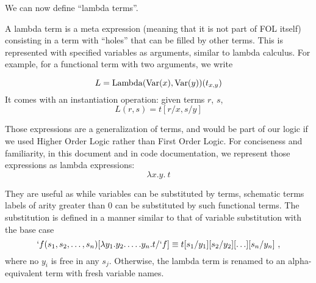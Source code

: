 We can now define \enquote{lambda terms}.
\begin{defin}
  A lambda term is a  meta expression (meaning that it is not part of FOL itself) consisting in a term with ``holes'' that can be filled by other terms. This is represented with specified variables as arguments, similar to lambda calculus. For example, for a functional term with two arguments, we write

  $$
    L = \operatorname{Lambda}(\operatorname{Var}(x), \operatorname{Var}(y))(t_{x,y})
  $$
  It comes with an instantiation operation: given terms $r$, $s$,
  $$L(r, s) = t[r/x, s/y]$$
\end{defin}
Those expressions are a generalization of terms, and would be part of our logic if we used Higher Order Logic rather than First Order Logic. For conciseness and familiarity, in this document and in code documentation, we represent those expressions as lambda expressions:
$$
  \lambda x.y. ~t
$$

They are useful as while variables can be substituted by terms, schematic terms labels of arity greater than 0 can be substituted by such functional terms.
The substitution is defined in a manner similar to that of variable substitution with the base case
%
\begin{equation*}
  `f(s_1, s_2, \ldots, s_n)[\lambda y_1.y_2.\ldots.y_n. t/`f] \equiv t[s_1/y_1][s_2/y_2][\ldots][s_n/y_n]~,
\end{equation*}
%
where no $y_i$ is free in any $s_j$. Otherwise, the lambda term is renamed to an alpha-equivalent term with fresh variable names.


